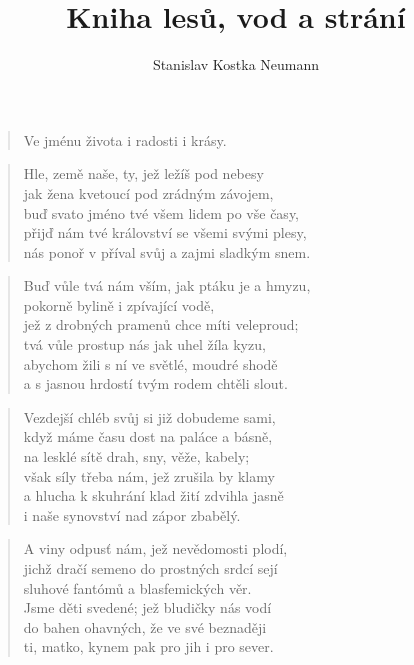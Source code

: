 \documentclass{book}
\title{Kniha lesů, vod a strání}
\author{Stanislav Kostka Neumann}
\begin{document}
\maketitle
\tableofcontents
\newpage
\markboth{}{}
\begin{verse}
Ve jménu života i radosti i krásy.
\end{verse}
\begin{verse}
Hle, země naše, ty, jež ležíš pod nebesy\\
jak žena kvetoucí pod zrádným závojem,\\
buď svato jméno tvé všem lidem po vše časy,\\
přijď nám tvé království se všemi svými plesy,\\
nás ponoř v příval svůj a zajmi sladkým snem.
\end{verse}
\begin{verse}
Buď vůle tvá nám vším, jak ptáku je a hmyzu,\\
pokorně bylině i zpívající vodě,\\
jež z drobných pramenů chce míti veleproud;\\
tvá vůle prostup nás jak uhel žíla kyzu,\\
abychom žili s ní ve světlé, moudré shodě\\
a s jasnou hrdostí tvým rodem chtěli slout.
\end{verse}
\begin{verse}
Vezdejší chléb svůj si již dobudeme sami,\\
když máme času dost na paláce a básně,\\
na lesklé sítě drah, sny, věže, kabely;\\
však síly třeba nám, jež zrušila by klamy\\
a hlucha k skuhrání klad žití zdvihla jasně\\
i naše synovství nad zápor zbabělý.
\end{verse}
\begin{verse}
A viny odpusť nám, jež nevědomosti plodí,\\
jichž dračí semeno do prostných srdcí sejí\\
sluhové fantómů a blasfemických věr.\\
Jsme děti svedené; jež bludičky nás vodí\\
do bahen ohavných, že ve své beznaději\\
ti, matko, kynem pak pro jih i pro sever.
\end{verse}
\end{document}
